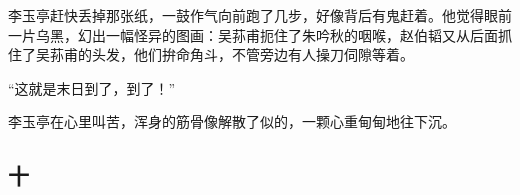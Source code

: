 \par 李玉亭赶快丢掉那张纸，一鼓作气向前跑了几步，好像背后有鬼赶着。他觉得眼前一片乌黑，幻出一幅怪异的图画：吴荪甫扼住了朱吟秋的咽喉，赵伯韬又从后面抓住了吴荪甫的头发，他们拚命角斗，不管旁边有人操刀伺隙等着。
\par “这就是末日到了，到了！”
\par 李玉亭在心里叫苦，浑身的筋骨像解散了似的，一颗心重甸甸地往下沉。


\subsection*{十}

